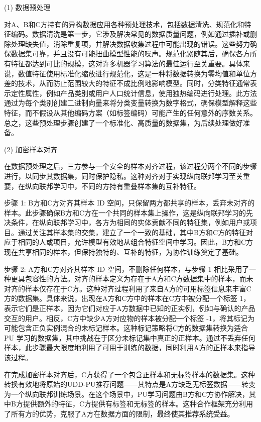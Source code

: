 (1) 数据预处理 

对A、B和C方持有的异构数据应用各种预处理技术，包括数据清洗、规范化和特征编码。数据清洗是第一步，它涉及解决常见的数据质量问题，例如通过插补或删除处理缺失值，消除重复项，并解决数据收集过程中可能出现的错误。这些努力确保数据集可靠，并且没有可能扭曲模型性能的噪声。规范化紧随其后，确保各方所有特征都达到可比的规模，这对许多机器学习算法的最佳运行至关重要。具体来说，数值特征使用标准化缩放进行规范化，这是一种将数据转换为零均值和单位方差的技术，从而防止范围较大的特征不成比例地影响模型。同时，分类特征通常表示定性属性，例如产品类别或用户人口统计信息，使用独热编码进行处理。此方法通过为每个类别创建二进制向量来将分类变量转换为数字格式，确保模型解释这些特征，而不假设从其他编码方案（如标签编码）可能产生的任何意外的序数关系。总之，这些预处理步骤创建了一个标准化、高质量的数据集，为后续处理做好准备。

(2) 加密样本对齐

在数据预处理之后，三方参与一个安全的样本对齐过程，该过程分两个不同的步骤进行，以同步其数据集，同时保护隐私。这种对齐对于实现纵向联邦学习至关重要，在纵向联邦学习中，不同的方持有重叠样本集的互补特征。 

步骤 1: B方和C方对齐其样本 ID 空间，只保留两方都共享的样本，丢弃未对齐的样本。此步骤确保B方和C方在一个共同的样本集上操作，这是纵向联邦学习的先决条件，在纵向联邦学习中，各方为相同的实体贡献不同的特征集，例如用户或项目。通过关注其样本集的交集，建立了一个一致的基础，其中B方和C方的特征对应于相同的人或项目，允许模型有效地从组合特征空间中学习。因此，B方和C方现在共享相同的样本，但保持独特的、互补的特征，为协作训练奠定了基础。

步骤 2: A方和C方对齐其样本 ID 空间，不删除任何样本，与步骤 1 相比采用了一种更具包容性的方法。对齐的样本定义为存在于A方和C方数据集中的样本，而未对齐的样本仅存在于C方。这种对齐过程利用了来自A方的可用标签信息来丰富C方的数据集。具体来说，出现在A方和C方中的样本在C方中被分配一个标签 1，表示它们是正样本，因为它们对应于A方数据中已知的正实例，例如与确认的产品交互的用户。相反，C方中缺少A方对应物的样本被分配一个标签 -1，将其标记为可能包含正负实例混合的未标记样本。这种标记策略将C方的数据集转换为适合 PU 学习的数据集，其中挑战在于区分未标记集中真正的正样本。通过不丢弃任何样本，此步骤最大限度地利用了可用于训练的数据，同时利用A方的正样本来指导该过程。

在完成加密样本对齐后，C方获得了一个包含正样本和无标签样本的数据集。这种转换有效地将原始的UDD-PU推荐问题——其特点是A方缺乏无标签数据——转变为一个纵向联邦训练场景。在这个场景中，PU学习问题由B方和C方协作解决，其中B方提供额外的特征，C方提供有标签和无标签的样本。这种合作框架充分利用了所有方的优势，克服了A方在数据方面的限制，最终使其推荐系统受益。

